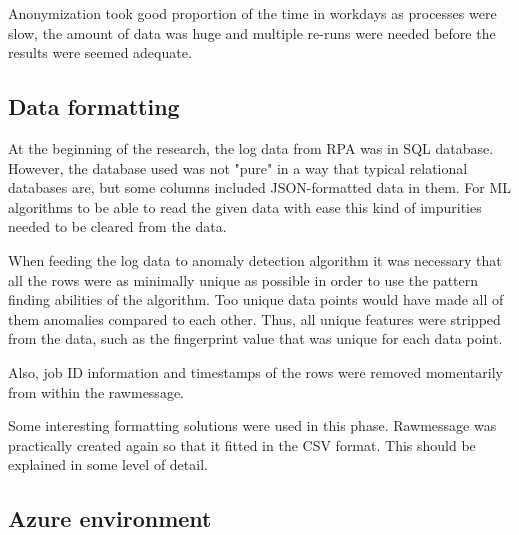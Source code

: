 Anonymization took good proportion of the time in workdays
as processes were slow,
the amount of data was huge
and multiple re-runs were needed
before the results were seemed adequate.



\subsection{Data formatting}\label{subsec:meth-data-formatting}
At the beginning of the research,
the log data from RPA was in SQL database.
However,
the database used was not "pure"
in a way that typical relational databases are,
but some columns included JSON-formatted data in them.
For ML algorithms to be able to read the given data with ease
this kind of impurities needed to be cleared from the data.

When feeding the log data to anomaly detection algorithm
it was necessary that all the rows were as minimally unique as possible
in order to use the pattern finding abilities of the algorithm.
Too unique data points would have made all of them anomalies
compared to each other.
Thus, all unique features were stripped from the data,
such as the fingerprint value
that was unique for each data point.
\begin{itcomment}
    Also,
    job ID information and timestamps of the rows
    were removed momentarily from within the rawmessage.
\end{itcomment}

\begin{itcomment}
    Some interesting formatting solutions were used in this phase.
    Rawmessage was practically created again
    so that it fitted in the CSV format.
    This should be explained in some level of detail.
\end{itcomment}




\subsection{Azure environment}\label{subsec:meth-azure-environment}

